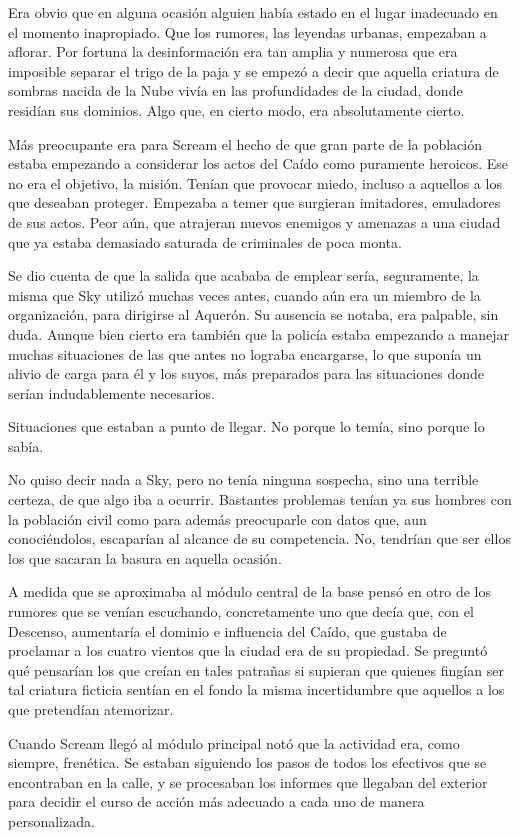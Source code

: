 Era obvio que en alguna ocasión alguien había estado en el lugar inadecuado en el momento inapropiado. Que los rumores, las leyendas urbanas, empezaban a aflorar. Por fortuna la desinformación era tan amplia y numerosa que era imposible separar el trigo de la paja y se empezó a decir que aquella criatura de sombras nacida de la Nube vivía en las profundidades de la ciudad, donde residían sus dominios. Algo que, en cierto modo, era absolutamente cierto.

Más preocupante era para Scream el hecho de que gran parte de la población estaba empezando a considerar los actos del Caído como puramente heroicos. Ese no era el objetivo, la misión. Tenían que provocar miedo, incluso a aquellos a los que deseaban proteger. Empezaba a temer que surgieran imitadores, emuladores de sus actos. Peor aún, que atrajeran nuevos enemigos y amenazas a una ciudad que ya estaba demasiado saturada de criminales de poca monta.

Se dio cuenta de que la salida que acababa de emplear sería, seguramente, la misma que Sky utilizó muchas veces antes, cuando aún era un miembro de la organización, para dirigirse al Aquerón. Su ausencia se notaba, era palpable, sin duda. Aunque bien cierto era también que la policía estaba empezando a manejar muchas situaciones de las que antes no lograba encargarse, lo que suponía un alivio de carga para él y los suyos, más preparados para las situaciones donde serían indudablemente necesarios.

Situaciones que estaban a punto de llegar. No porque lo temía, sino porque lo sabía.

No quiso decir nada a Sky, pero no tenía ninguna sospecha, sino una terrible certeza, de que algo iba a ocurrir. Bastantes problemas tenían ya sus hombres con la población civil como para además preocuparle con datos que, aun conociéndolos, escaparían al alcance de su competencia. No, tendrían que ser ellos los que sacaran la basura en aquella ocasión.

A medida que se aproximaba al módulo central de la base pensó en otro de los rumores que se venían escuchando, concretamente uno que decía que, con el Descenso, aumentaría el dominio e influencia del Caído, que gustaba de proclamar a los cuatro vientos que la ciudad era de su propiedad. Se preguntó qué pensarían los que creían en tales patrañas si supieran que quienes fingían ser tal criatura ficticia sentían en el fondo la misma incertidumbre que aquellos a los que pretendían atemorizar.

Cuando Scream llegó al módulo principal notó que la actividad era, como siempre, frenética. Se estaban siguiendo los pasos de todos los efectivos que se encontraban en la calle, y se procesaban los informes que llegaban del exterior para decidir el curso de acción más adecuado a cada uno de manera personalizada.

